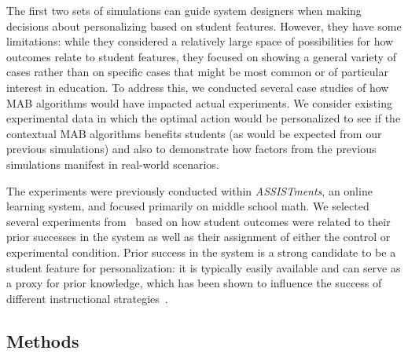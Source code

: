 The first two sets of simulations can guide system designers when making decisions about personalizing based on student features. However, they have some limitations: while they considered a relatively large space of possibilities for how outcomes relate to student features, they focused on showing a general variety of cases rather than on specific cases that might be most common or of particular interest in education. To address this, we conducted several case studies of how MAB algorithms would have impacted actual experiments. We consider existing experimental data in which the optimal action would be personalized to see if the contextual MAB algorithms benefits students (as would be expected from our previous simulations) and also to demonstrate how factors from the previous simulations manifest in real-world scenarios. 

The experiments were previously conducted within \textit{ASSISTments}, an online learning system, and focused primarily on middle school math. We selected several experiments from~\cite{selent2016assistments}  based on how student outcomes were related to their prior successes in the system as well as their assignment of either the control or experimental condition. Prior success in the system is a strong candidate to be a student feature for personalization: it is typically easily available and can serve as a proxy for prior knowledge, which has been shown to influence the success of different instructional strategies~\cite{shute2008focus}. 

\subsection{Methods}

